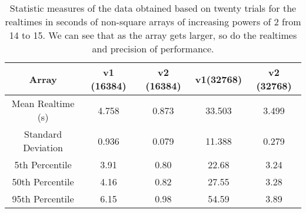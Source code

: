 \documentclass[a4paper]{article}
\begin{document}
\begin{table}[H]
\centering
\begin{tabular}{|c|c|c|c|c|}
\hline
Array & v1 (16384) & v2 (16384) & v1(32768) & v2 (32768)\\\hline
Mean Realtime (s) & 4.758 & 0.873 & 33.503 & 3.499 \\\hline
Standard Deviation & 0.936 & 0.079 & 11.388 & 0.279 \\\hline
5th Percentile & 3.91 & 0.80 & 22.68 & 3.24 \\\hline
50th Percentile & 4.16 & 0.82 & 27.55 & 3.28 \\\hline
95th Percentile & 6.15 & 0.98 & 54.59 & 3.89 \\\hline
\end{tabular}
\caption{\label{tab:widgets}Statistic measures of the data obtained based on twenty trials for the realtimes in seconds of non-square arrays of increasing powers of 2 from 14 to 15. We can see that as the array gets larger, so do the realtimes and precision of performance.}
\end{table}
\end{document}
